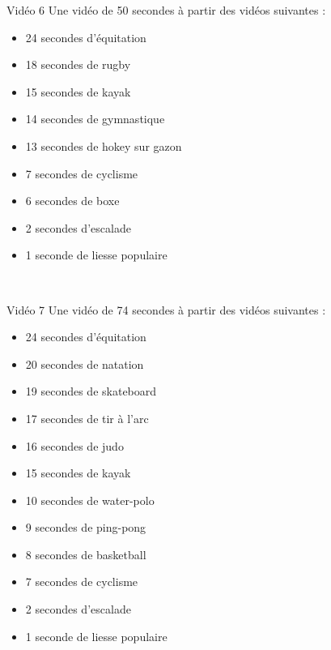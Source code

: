 \documentclass[10pt, a5paper,twoside]{article}
\begin{document}
\vfill

\begin{card}[width = \textwidth, colback = olympicblue, colframe = olympicblue, bottomtitle = 2mm]{Vidéo 6}
  Une vidéo de 50 secondes à partir des vidéos suivantes :
  \vspace{-1mm}\begin{itemize}
    \item 24 secondes d'équitation
    \item 18 secondes de rugby
    \item 15 secondes de kayak
    \item 14 secondes de gymnastique
    \item 13 secondes de hokey sur gazon
    \item 7 secondes de cyclisme
    \item 6 secondes de boxe
    \item 2 secondes d'escalade
    \item 1 seconde de liesse populaire
  \end{itemize}
\end{card}

\vfill

\clearpage
~
\vfill

\begin{card}[width = \textwidth, colback = olympicblue, colframe = olympicblue, bottomtitle = 2mm]{Vidéo 7}
  Une vidéo de 74 secondes à partir des vidéos suivantes :
  \vspace{-1mm}\begin{itemize}
    \item 24 secondes d'équitation
    \item 20 secondes de natation
    \item 19 secondes de skateboard
    \item 17 secondes de tir à l'arc
    \item 16 secondes de judo
    \item 15 secondes de kayak
    \item 10 secondes de water-polo
    \item 9 secondes de ping-pong
    \item 8 secondes de basketball
    \item 7 secondes de cyclisme
    \item 2 secondes d'escalade
    \item 1 seconde de liesse populaire
  \end{itemize}
\end{card}
\end{document}
